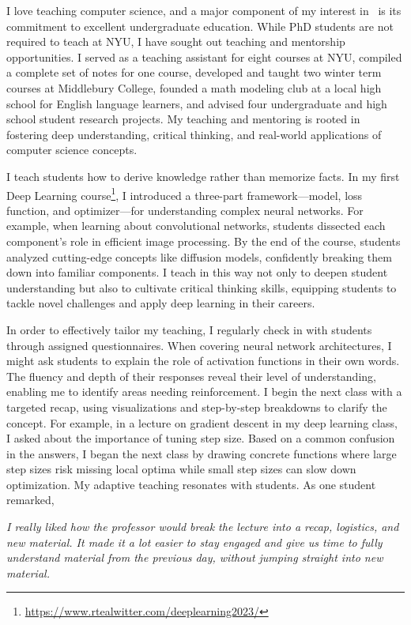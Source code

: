 \documentclass[11pt]{article}
\begin{document}
{\setlength{\parindent}{0cm}

I love teaching computer science, and a major component of my interest in \school~is its commitment to excellent undergraduate education. While PhD students are not required to teach at NYU, I have sought out teaching and mentorship opportunities. I served as a teaching assistant for eight courses at NYU, compiled a complete set of notes for one course, developed and taught two winter term courses at Middlebury College, founded a math modeling club at a local high school for English language learners, and advised four undergraduate and high school student research projects. My teaching and mentoring is rooted in fostering deep understanding, critical thinking, and real-world applications of computer science concepts.

I teach students how to derive knowledge rather than memorize facts. In my first Deep Learning course\footnote{\url{https://www.rtealwitter.com/deeplearning2023/}}, I introduced a three-part framework—model, loss function, and optimizer—for understanding complex neural networks. For example, when learning about convolutional networks, students dissected each component’s role in efficient image processing. By the end of the course, students analyzed cutting-edge concepts like diffusion models, confidently breaking them down into familiar components. I teach in this way not only to deepen student understanding but also to cultivate critical thinking skills, equipping students to tackle novel challenges and apply deep learning in their careers.

In order to effectively tailor my teaching, I regularly check in with students through assigned questionnaires. When covering neural network architectures, I might ask students to explain the role of activation functions in their own words. The fluency and depth of their responses reveal their level of understanding, enabling me to identify areas needing reinforcement. I begin the next class with a targeted recap, using visualizations and step-by-step breakdowns to clarify the concept. For example, in a lecture on gradient descent in my deep learning class, I asked about the importance of tuning step size. Based on a common confusion in the answers, I began the next class by drawing concrete functions where large step sizes risk missing local optima while small step sizes can slow down optimization. My adaptive teaching resonates with students. As one student remarked,

\begin{displayquote}
	\textit{I really liked how the professor would break the lecture into a recap, logistics, and new material. It made it a lot easier to stay engaged and give us time to fully understand material from the previous day, without jumping straight into new material.}
\end{displayquote}

}
\end{document}
